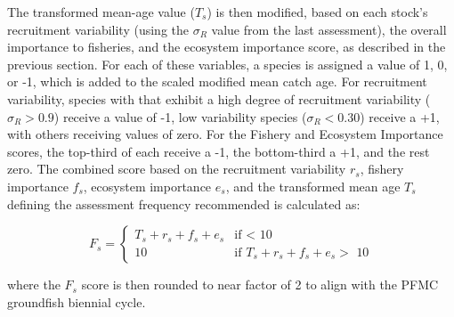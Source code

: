 \documentclass[11pt,
  english,
  a4paper,
]{article}
\begin{document}
The transformed mean-age value ({\(T_s\)\leavevmode\tagmcend\tagstructend}) is then modified, based on each stock's recruitment variability (using the {\(\sigma_R\)\leavevmode\tagmcend\tagstructend} value from the last assessment), the overall importance to fisheries, and the ecosystem importance score, as described in the previous section. For each of these variables, a species is assigned a value of 1, 0, or -1, which is added to the scaled modified mean catch age. For recruitment variability, species with that exhibit a high degree of recruitment variability ({\(\sigma_R > 0.9\)\leavevmode\tagmcend\tagstructend}) receive a value of -1, low variability species ({\(\sigma_R < 0.30\)\leavevmode\tagmcend\tagstructend}) receive a +1, with others receiving values of zero. For the Fishery and Ecosystem Importance scores, the top-third of each receive a -1, the bottom-third a +1, and the rest zero. The combined score based on the recruitment variability {\(r_s\)\leavevmode\tagmcend\tagstructend}, fishery importance {\(f_s\)\leavevmode\tagmcend\tagstructend}, ecosystem importance {\(e_s\)\leavevmode\tagmcend\tagstructend}, and the transformed mean age {\(T_s\)\leavevmode\tagmcend\tagstructend} defining the assessment frequency recommended is calculated as:

\leavevmode\tagmcend\tagstructend\par


{\[
F_s =
\begin{cases} 
T_s + r_s + f_s + e_s & \text{if $<$ 10}\\ 
10 & \text{if $T_s + r_s + f_s + e_s >$ 10} 
\end{cases}
\]\leavevmode\tagmcend\tagstructend}

\leavevmode\tagmcend\tagstructend\par


where the {\(F_s\)\leavevmode\tagmcend\tagstructend} score is then rounded to near factor of 2 to align with the PFMC groundfish biennial cycle.
\end{document}
